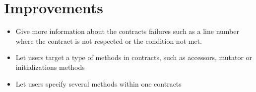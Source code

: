 \section{Improvements}

\begin{itemize}
\item{Give more information about the contracts failures such as a line number where the contract is not respected or the condition not met.}
\item{Let users target a type of methods in contracts, such as accessors, mutator or initializations methods}
\item{Let users specify several methods within one contracts}
\end{itemize}  

